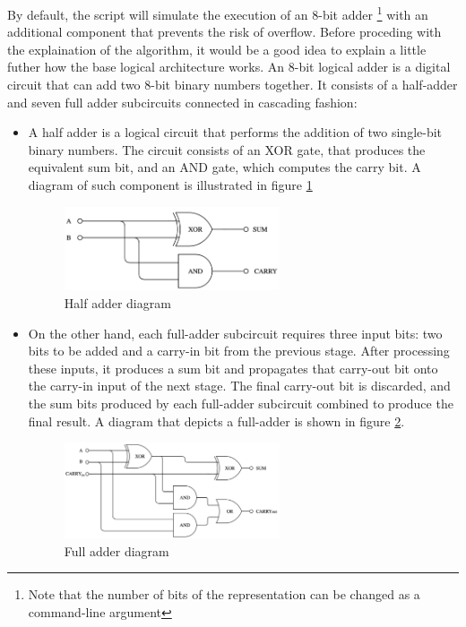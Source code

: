\documentclass[12pt]{article}
\begin{document}
By default, the script will simulate the execution of an 8-bit adder \footnote{Note that the number of bits of the representation can be changed as a command-line argument} with an additional component that prevents the risk of overflow. Before proceding with the explaination of the algorithm, it would be a good idea to explain a little futher how the base logical architecture works.
An 8-bit logical adder is a digital circuit that can add two 8-bit binary numbers together. It consists of a half-adder and seven full adder subcircuits connected in cascading fashion:
\begin{itemize}
  \item A half adder is a logical circuit that performs the addition of two single-bit binary numbers. The circuit consists of an XOR gate, that produces the equivalent sum bit, and an AND gate, which computes the carry bit. A diagram of such component is illustrated in figure \ref{fig:halfadder}

  \begin{figure}[h]
    \centering
    \includegraphics[width=0.6\textwidth]{halfadder.png}
    \caption{Half adder diagram}\label{fig:halfadder}
  \end{figure}
  
  \item On the other hand, each full-adder subcircuit requires three input bits: two bits to be added and a carry-in bit from the previous stage. After processing these inputs, it produces a sum bit and propagates that carry-out bit onto the carry-in input of the next stage. The final carry-out bit is discarded, and the sum bits produced by each full-adder subcircuit combined to produce the final result. A diagram that depicts a full-adder is shown in figure \ref{fig:fulladder}.

  \begin{figure}[h]
    \centering
    \includegraphics[width=0.6\textwidth]{fulladder.png}
    \caption{Full adder diagram}\label{fig:fulladder}
  \end{figure}
\end{itemize}
\end{document}
